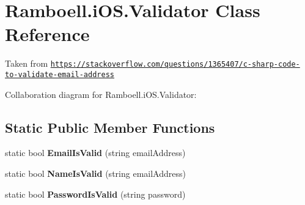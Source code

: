 \hypertarget{class_ramboell_1_1i_o_s_1_1_validator}{}\section{Ramboell.\+i\+O\+S.\+Validator Class Reference}
\label{class_ramboell_1_1i_o_s_1_1_validator}


Taken from \href{https://stackoverflow.com/questions/1365407/c-sharp-code-to-validate-email-address}{\tt https\+://stackoverflow.\+com/questions/1365407/c-\/sharp-\/code-\/to-\/validate-\/email-\/address}  




Collaboration diagram for Ramboell.\+i\+O\+S.\+Validator\+:
\subsection*{Static Public Member Functions}
\begin{DoxyCompactItemize}
\item 
\mbox{\label{class_ramboell_1_1i_o_s_1_1_validator_a4ddde85cd5af147feb9f2a308ea86f47}} 
static bool {\bfseries Email\+Is\+Valid} (string email\+Address)
\item 
\mbox{\label{class_ramboell_1_1i_o_s_1_1_validator_a416dae415a4c4233709f314d52cb7656}} 
static bool {\bfseries Name\+Is\+Valid} (string email\+Address)
\item 
\mbox{\label{class_ramboell_1_1i_o_s_1_1_validator_a0de089b1419ac4021fa74bb450bc6c49}} 
static bool {\bfseries Password\+Is\+Valid} (string password)
\end{DoxyCompactItemize}
